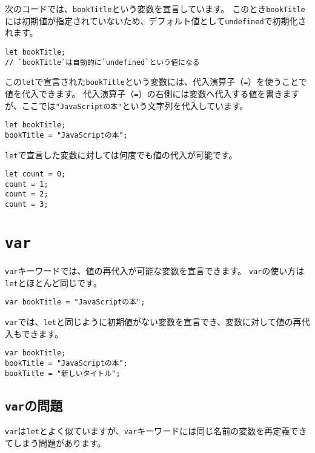 次のコードでは、\texttt{bookTitle}という変数を宣言しています。
このとき\texttt{bookTitle}には初期値が指定されていないため、デフォルト値として\texttt{undefined}で初期化されます。

\begin{lstlisting}
let bookTitle;
// `bookTitle`は自動的に`undefined`という値になる
\end{lstlisting}

この\texttt{let}で宣言された\texttt{bookTitle}という変数には、代入演算子（\texttt{=}）を使うことで値を代入できます。
代入演算子（\texttt{=}）の右側には変数へ代入する値を書きますが、ここでは\texttt{"JavaScriptの本"}という文字列を代入しています。

\begin{lstlisting}
let bookTitle;
bookTitle = "JavaScriptの本";
\end{lstlisting}

\texttt{let}で宣言した変数に対しては何度でも値の代入が可能です。

\begin{lstlisting}
let count = 0;
count = 1;
count = 2;
count = 3;
\end{lstlisting}

\hypertarget{var}{%
\section{\texorpdfstring{\texttt{var}}{var}}\label{var}}

\texttt{var}キーワードでは、値の再代入が可能な変数を宣言できます。
\texttt{var}の使い方は\texttt{let}とほとんど同じです。

\begin{lstlisting}
var bookTitle = "JavaScriptの本";
\end{lstlisting}

\texttt{var}では、\texttt{let}と同じように初期値がない変数を宣言でき、変数に対して値の再代入もできます。

\begin{lstlisting}
var bookTitle;
bookTitle = "JavaScriptの本";
bookTitle = "新しいタイトル";
\end{lstlisting}

\hypertarget{var-issues}{%
\subsection{\texorpdfstring{\texttt{var}の問題}{varの問題}}\label{var-issues}}

\texttt{var}は\texttt{let}とよく似ていますが、\texttt{var}キーワードには同じ名前の変数を再定義できてしまう問題があります。

